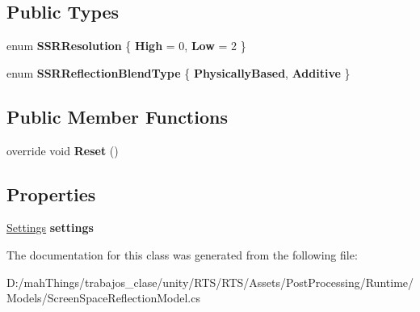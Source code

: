 \subsection*{Public Types}
\begin{DoxyCompactItemize}
\item 
\mbox{\label{class_unity_engine_1_1_post_processing_1_1_screen_space_reflection_model_acbe36890d4b8ede4152e13108af7ba1f}} 
enum {\bfseries S\+S\+R\+Resolution} \{ {\bfseries High} = 0, 
{\bfseries Low} = 2
 \}
\item 
\mbox{\label{class_unity_engine_1_1_post_processing_1_1_screen_space_reflection_model_acb7310312d36f7cf7cf72d923ee5271b}} 
enum {\bfseries S\+S\+R\+Reflection\+Blend\+Type} \{ {\bfseries Physically\+Based}, 
{\bfseries Additive}
 \}
\end{DoxyCompactItemize}
\subsection*{Public Member Functions}
\begin{DoxyCompactItemize}
\item 
\mbox{\label{class_unity_engine_1_1_post_processing_1_1_screen_space_reflection_model_abf314aab69e370e9f092e17e69a57066}} 
override void {\bfseries Reset} ()
\end{DoxyCompactItemize}
\subsection*{Properties}
\begin{DoxyCompactItemize}
\item 
\mbox{\label{class_unity_engine_1_1_post_processing_1_1_screen_space_reflection_model_a8d261a46d42d443edb5cc23d9e8bdfb7}} 
\mbox{\hyperlink{struct_unity_engine_1_1_post_processing_1_1_screen_space_reflection_model_1_1_settings}{Settings}} {\bfseries settings}
\end{DoxyCompactItemize}


The documentation for this class was generated from the following file\+:\begin{DoxyCompactItemize}
\item 
D\+:/mah\+Things/trabajos\+\_\+clase/unity/\+R\+T\+S/\+R\+T\+S/\+Assets/\+Post\+Processing/\+Runtime/\+Models/Screen\+Space\+Reflection\+Model.\+cs\end{DoxyCompactItemize}
